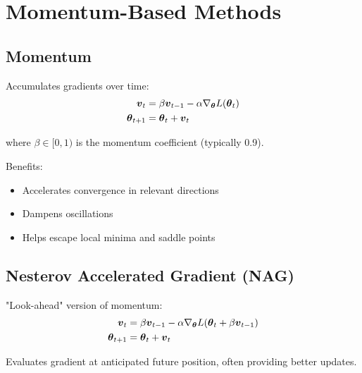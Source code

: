 
\section{Momentum-Based Methods}
\label{sec:momentum}

\subsection{Momentum}

Accumulates gradients over time:
\begin{align}
\boldsymbol{v}_t &= \beta \boldsymbol{v}_{t-1} - \alpha \nabla_{\boldsymbol{\theta}} L(\boldsymbol{\theta}_t) \\
\boldsymbol{\theta}_{t+1} &= \boldsymbol{\theta}_t + \boldsymbol{v}_t
\end{align}

where $\beta \in [0, 1)$ is the momentum coefficient (typically 0.9).

Benefits:
\begin{itemize}
    \item Accelerates convergence in relevant directions
    \item Dampens oscillations
    \item Helps escape local minima and saddle points
\end{itemize}

\subsection{Nesterov Accelerated Gradient (NAG)}

"Look-ahead" version of momentum:
\begin{align}
\boldsymbol{v}_t &= \beta \boldsymbol{v}_{t-1} - \alpha \nabla_{\boldsymbol{\theta}} L(\boldsymbol{\theta}_t + \beta \boldsymbol{v}_{t-1}) \\
\boldsymbol{\theta}_{t+1} &= \boldsymbol{\theta}_t + \boldsymbol{v}_t
\end{align}

Evaluates gradient at anticipated future position, often providing better updates.

